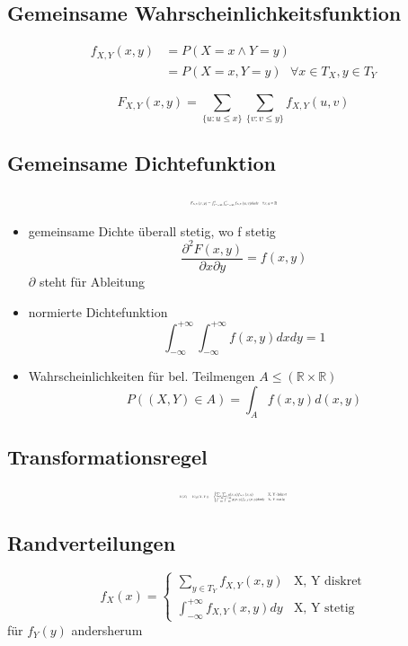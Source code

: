 \documentclass[10pt,a4paper,landscape]{article}
\begin{document}
\begin{multicols}{4}
\subsection{Gemeinsame Wahrscheinlichkeitsfunktion}
\begin{align*}
f_{X,Y}(x,y) &= P(X = x \wedge Y=y) \\
&= P(X=x, Y=y) ~~~\forall x \in T_X, y \in T_Y
\end{align*}

\[ 
F_{X,Y}(x,y)= \sum_{\{u: u \leq x \}} \sum_{\{v:v \leq y\}} f_{X,Y}(u,v)
\]

\subsection{Gemeinsame Dichtefunktion}
\[ \resizebox{0.2\textwidth}{!}{$
F_{X,Y}(x,y)=\int_{v= - \infty}^y \int_{u=- \infty}^x f_{X,Y}(u,v)dudv ~~~ \forall x,y \in \mathbb{R}
$}
\]

\begin{itemize}
\item gemeinsame Dichte überall stetig, wo f stetig
\[
\frac{\partial^2F(x,y)}{\partial x \partial y}=f(x,y)
\]
$\partial$ steht für Ableitung
\item normierte Dichtefunktion
\[
\int_{- \infty}^{+\infty} \int_{- \infty}^{+\infty} f(x,y)dxdy=1
\]
\item Wahrscheinlichkeiten für bel. Teilmengen $A \leqslant (\mathbb{R} \times \mathbb{R})$
\[
P((X,Y) \in A) = \int_A f(x,y)d(x,y)
\]
\end{itemize}

\subsection{Transformationsregel}
\[ \resizebox{0.25\textwidth}{!}{$
E(Z)=E(g(X,Y))= \begin{cases}
\sum_x \sum_y g(x,y)f_{X,Y}(x,y) &\text{X, Y diskret} \\
\int_{- \infty}^{+\infty} \int_{- \infty}^{+\infty} g(x,y)f_{X,Y}(x,y)dxdy &\text{X, Y stetig}
\end{cases}
$}
\]

\subsection{Randverteilungen}
\[
f_X(x)=\begin{cases}
\sum_{y \in T_Y} f_{X,Y}(x,y) &\text{X, Y diskret} \\
\int_{- \infty}^{+\infty} f_{X,Y}(x,y)dy &\text{X, Y stetig}
\end{cases}
\]
für $f_Y(y)$ andersherum


\end{multicols}
\end{document}
